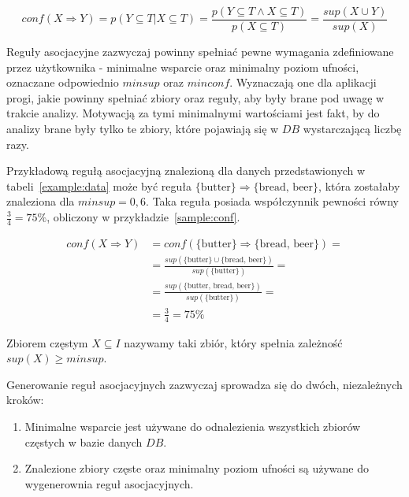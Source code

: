 \begin{equation}\label{confidence:def2}
	conf(X \Rightarrow Y) = p(Y \subseteq T | X\subseteq T) = \frac{p(Y \subseteq T \land X\subseteq T)}{p(X\subseteq T)} =\frac{sup(X \cup Y)}{sup(X)}
\end{equation}

Reguły asocjacyjne zazwyczaj powinny spełniać pewne wymagania zdefiniowane przez użytkownika - minimalne wsparcie oraz minimalny poziom ufności, oznaczane odpowiednio $minsup$ oraz $minconf$. Wyznaczają one dla aplikacji progi, jakie powinny spełniać zbiory oraz reguły, aby były brane pod uwagę w trakcie analizy. Motywacją za tymi minimalnymi wartościami jest fakt, by do analizy brane były tylko te zbiory, które pojawiają się w $DB$ wystarczającą liczbę razy.

Przykładową regułą asocjacyjną znalezioną dla danych przedstawionych w tabeli~\ref{example:data} może być reguła $\lbrace \textrm{butter} \rbrace \Rightarrow \lbrace \textrm{bread, beer} \rbrace$, która zostałaby znaleziona dla $minsup = 0,6$. Taka reguła posiada współczynnik pewności równy $\frac{3}{4}=75\%$, obliczony w przykładzie~\ref{sample:conf}.

\begin{equation}\label{sample:conf}
\begin{split}
conf(X \Rightarrow Y)& = conf(\lbrace \textrm{butter} \rbrace \Rightarrow \lbrace \textrm{bread, beer} \rbrace) =\\
& = \frac{sup(\lbrace \textrm{butter} \rbrace \cup \lbrace \textrm{bread, beer} \rbrace)}{sup(\lbrace \textrm{butter} \rbrace)} =\\
& = \frac{sup(\lbrace \textrm{butter, bread, beer} \rbrace)}{sup(\lbrace \textrm{butter} \rbrace)} =\\
& = \frac{3}{4} = 75\%
\end{split}
\end{equation}

\begin{df}
Zbiorem częstym $X \subseteq I$ nazywamy taki zbiór, który spełnia zależność $sup(X) \geq minsup$.
\end{df}

Generowanie reguł asocjacyjnych zazwyczaj sprowadza się do dwóch, niezależnych kroków:
\begin{enumerate}
	\item Minimalne wsparcie jest używane do odnalezienia wszystkich zbiorów częstych w bazie danych $DB$.
	\item Znalezione zbiory częste oraz minimalny poziom ufności są używane do wygenerownia reguł asocjacyjnych.
\end{enumerate}


